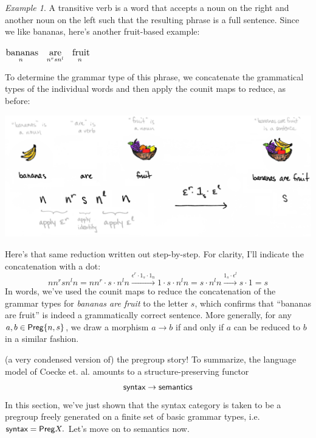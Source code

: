 \documentclass{tufte-handout-tai}
\newcommand{\cat}[1]{{\normalfont\textsf{#1}}}
\theoremstyle{plain}
\theoremstyle{definition}
\theoremstyle{remark}
\newtheorem{ex}[thm]{Example}
\begin{document}
\begin{ex}
\noindent A transitive verb is a word that accepts a noun on the right and another noun on the left such that the resulting phrase is a full sentence. Since we like bananas, here's another fruit-based example:
\begin{center}
$\underset{n^{\phantom{l}}}{\text{\large bananas}} \quad 
\underset{n^rsn^l}{\text{\large are}} \quad
\underset{n^{\phantom{l}}}{\text{\large fruit}}$
\end{center}
To determine the grammar type of this phrase, we concatenate the grammatical types of the individual words and then apply the counit maps to reduce, as before:
\begin{fullwidth}
\begin{center}\label{pic:fruit}
\includegraphics{fruit2.jpg}
\end{center}
\end{fullwidth}
Here's that same reduction written out step-by-step. For clarity, I'll indicate the concatenation with a dot: 
	\[
	n n^rsn^ln= nn^r\cdot s\cdot n^ln \overset{\epsilon^r\cdot 1_s\cdot 1_n}{\longrightarrow} 1\cdot s\cdot n^ln = s\cdot n^ln 
	\overset{1_s\cdot \epsilon^l}{\longrightarrow} s\cdot 1
	=s
	\]
In words, we've used the counit maps to reduce the concatenation of the grammar types for \textit{bananas are fruit} to the letter $s$, which confirms that ``bananas are fruit'' is indeed a grammatically correct sentence. More generally, for any $a,b\in \cat{Preg}\{n,s\}$, we draw a morphism $a\to b$ if and only if $a$ can be reduced to $b$ in a similar fashion.
\end{ex}

 (a very condensed version of) the pregroup story! To summarize, the language model of Coecke et. al. amounts to a structure-preserving functor
\[\cat{syntax}\to\cat{semantics}\]
In this section, we've just shown that the syntax category is taken to be a pregroup freely generated on a finite set of basic grammar types, i.e. $\cat{syntax} = \cat{Preg}X.$ Let's move on to semantics now. 
\end{document}
